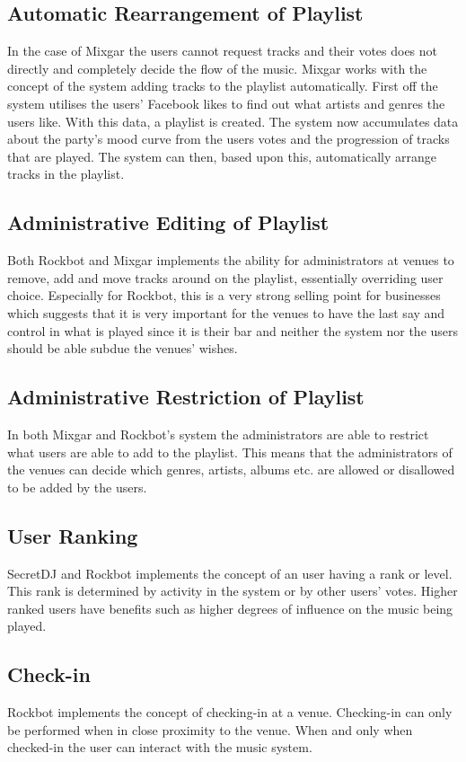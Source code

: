 \subsection{Automatic Rearrangement of Playlist}
\label{sub:auto_rearrange_playlist}
In the case of Mixgar the users cannot request tracks and their votes
does not directly and completely decide the flow of the music. Mixgar
works with the concept of the system adding tracks to the playlist
automatically. First off the system utilises the users’ Facebook likes
to find out what artists and genres the users like. With this data, a
playlist is created. The system now accumulates data about the party’s
mood curve from the users votes and the progression of tracks that are played. The system
can then, based upon this, automatically arrange tracks in the
playlist.

\subsection{Administrative Editing of Playlist}
Both Rockbot and
Mixgar implements the ability for administrators at venues to remove, add
and move tracks around on the playlist, essentially overriding user choice. Especially for Rockbot, this
is a very strong selling point for businesses which suggests that it
is very important for the venues to have the last say and control in
what is played since it is their bar and neither the system nor the users
should be able subdue the venues' wishes.

\subsection{Administrative Restriction of Playlist}
In both Mixgar and Rockbot's system the administrators are able to
restrict what users are able to add to the playlist. This means that
the administrators of the venues can decide which genres, artists,
albums etc. are allowed or disallowed to be added by the users.

\subsection{User Ranking}
SecretDJ and Rockbot implements the concept of an user having a rank or
level. This rank is determined by activity in the system or by other
users' votes. Higher ranked users have benefits such as higher degrees
of influence on the music being played.

\subsection{Check-in}
Rockbot implements the concept of checking-in at a venue. Checking-in
can only be performed when in close proximity to the venue. When and
only when checked-in the user can interact with the music system.

